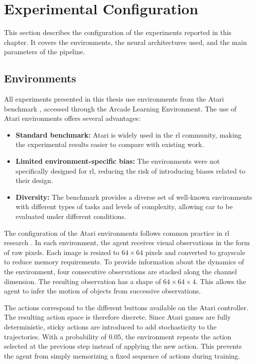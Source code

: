 \section{Experimental Configuration}
\label{sec:experiments_configuration}

This section describes the configuration of the experiments reported in this chapter.
It covers the environments, the neural architectures used, and the main parameters of the pipeline.

\subsection{Environments}

All experiments presented in this thesis use environments from the Atari benchmark \parencite{Bellemare_2013}, accessed through the Arcade Learning Environment.
The use of Atari environments offers several advantages:

\begin{itemize}
\item \textbf{Standard benchmark:} Atari is widely used in the \gls{rl} community, making the experimental results easier to compare with existing work.
\item \textbf{Limited environment-specific bias:} The environments were not specifically designed for \gls{rl}, reducing the risk of introducing biases related to their design.
\item \textbf{Diversity:} The benchmark provides a diverse set of well-known environments with different types of tasks and levels of complexity, allowing \gls{car} to be evaluated under different conditions.
\end{itemize}

The configuration of the Atari environments follows common practice in \gls{rl} research \parencite{machado2017revisitingarcadelearningenvironment}.
In each environment, the agent receives visual observations in the form of raw pixels.
Each image is resized to $64 \times 64$ pixels and converted to grayscale to reduce memory requirements.
To provide information about the dynamics of the environment, four consecutive observations are stacked along the channel dimension.
The resulting observation has a shape of $64 \times 64 \times 4$.
This allows the agent to infer the motion of objects from successive observations.

The actions correspond to the different buttons available on the Atari controller.
The resulting action space is therefore discrete.
Since Atari games are fully deterministic, sticky actions are introduced to add stochasticity to the trajectories.
With a probability of $0.05$, the environment repeats the action selected at the previous step instead of applying the new action.
This prevents the agent from simply memorizing a fixed sequence of actions during training.

